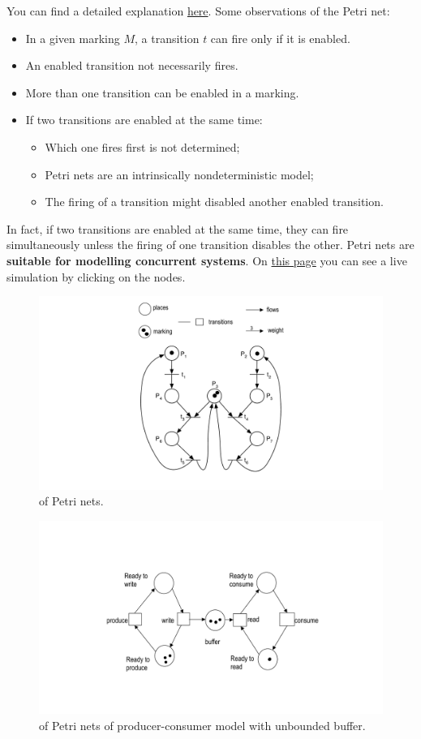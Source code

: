\highspace
You can find a detailed explanation \href{https://isr.umd.edu/Labs/CIM/miscs/wmsor97.pdf}{here}. Some observations of the Petri net:
\begin{itemize}
    \item In a given marking $M$, a transition $t$ can fire only if it is enabled.

    \item An enabled transition not necessarily fires.

    \item More than one transition can be enabled in a marking.

    \item If two transitions are enabled at the same time:
    \begin{itemize}
        \item Which one fires first is not determined;
        \item Petri nets are an intrinsically nondeterministic model;
        \item The firing of a transition might disabled another enabled transition.
    \end{itemize}
\end{itemize}
In fact, if two transitions are enabled at the same time, they can fire simultaneously unless the firing of one transition disables the other. Petri nets are \textbf{suitable for modelling concurrent systems}. On \href{http://petrinet.org/}{this page} you can see a live simulation by clicking on the nodes.

\newpage

\begin{figure}[!htp]
    \centering
    \includegraphics[width=.6\textwidth]{img/petri-nets-1.pdf}
    \caption{ of Petri nets.}
\end{figure}

\begin{figure}[!htp]
    \centering
    \includegraphics[width=.9\textwidth]{img/petri-nets-2.pdf}
    \caption{ of Petri nets of producer-consumer model with unbounded buffer.}
\end{figure}

